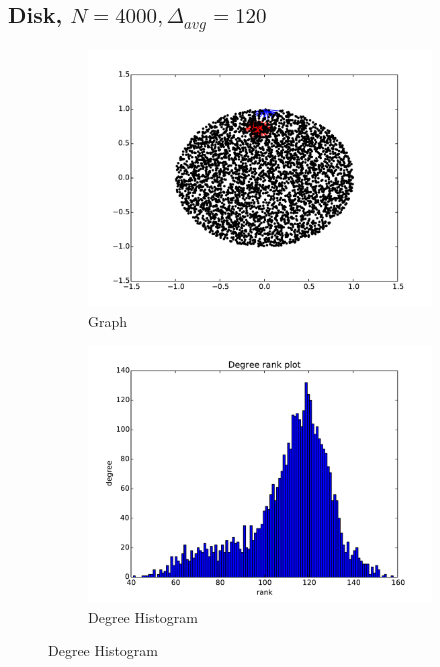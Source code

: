\documentclass[oneside, titlepage]{scrartcl}
\begin{document}
\subsection{Disk, $N=4000, \Delta_{avg}=120$}
\begin{figure}[!h]
\centering
\begin{subfigure}{0.5\textwidth}
	\centering
	\includegraphics[width=0.9\linewidth]{figures/graph7.pdf}
	\caption{Graph}
\end{subfigure}%
\begin{subfigure}{0.5\textwidth}
	\centering
	\includegraphics[width=0.9\linewidth]{figures/degrees7.pdf}
	\caption{Degree Histogram}
\end{subfigure}


\end{figure}
\end{document}

